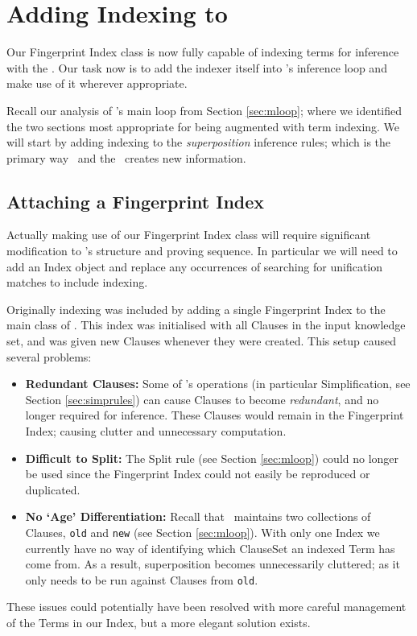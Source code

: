 \section{Adding Indexing to \Beagle}
Our Fingerprint Index class is now fully capable of indexing terms for inference
with the \HSWAC. Our task now is to add the indexer itself into \beagle's inference
loop and make use of it wherever appropriate.

Recall our analysis of \beagle's main loop from Section \ref{sec:mloop}; where we identified
the two sections most appropriate for being augmented with term indexing. We will
start by adding indexing to the \emph{superposition} inference rules; which is
the primary way \beagle\ and the \HSWAC\ creates new information.

\subsection{Attaching a Fingerprint Index}

Actually making use of our Fingerprint Index class will require significant modification
to \beagle's structure and proving sequence. In particular we will need
to add an Index object and replace any occurrences of searching for unification matches
to include indexing.

Originally indexing was included by adding a single Fingerprint Index to the main
class of \beagle. This index was initialised with all Clauses in the input knowledge set,
and was given new Clauses whenever they were created. This setup caused several
problems:
\begin{itemize}
\item \textbf{Redundant Clauses:} Some of \Beagle's operations (in particular Simplification, see Section \ref{sec:simprules})
can cause Clauses to become \emph{redundant}, and no longer required for inference.
These Clauses would remain in the Fingerprint Index; causing clutter and unnecessary
computation.
\item \textbf{Difficult to Split:} The Split rule (see Section \ref{sec:mloop})
could no longer be used since the Fingerprint Index could not easily be reproduced or
duplicated.
\item \textbf{No `Age' Differentiation:} Recall that \beagle\ maintains
two collections of Clauses, \verb!old! and \verb!new! (see Section \ref{sec:mloop}).
With only one Index we currently have no way of identifying which ClauseSet an indexed
Term has come from. As a result, superposition becomes unnecessarily cluttered;
as it only needs to be run against Clauses from \verb!old!.
\end{itemize}
These issues could potentially have been resolved with more careful management of
the Terms in our Index, but a more elegant solution exists.

